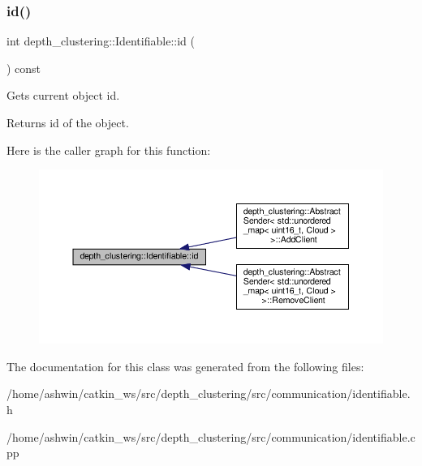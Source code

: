 \subsubsection{\texorpdfstring{id()}{id()}}
{\footnotesize\ttfamily int depth\+\_\+clustering\+::\+Identifiable\+::id (\begin{DoxyParamCaption}{ }\end{DoxyParamCaption}) const\hspace{0.3cm}{\ttfamily [inline]}}



Gets current object id. 

\begin{DoxyReturn}{Returns}
id of the object. 
\end{DoxyReturn}
Here is the caller graph for this function\+:\nopagebreak
\begin{figure}[H]
\begin{center}
\leavevmode
\includegraphics[width=350pt]{classdepth__clustering_1_1Identifiable_a50f8b49ce7f7f0d9d02f31f74e0fc9e0_icgraph}
\end{center}
\end{figure}


The documentation for this class was generated from the following files\+:\begin{DoxyCompactItemize}
\item 
/home/ashwin/catkin\+\_\+ws/src/depth\+\_\+clustering/src/communication/identifiable.\+h\item 
/home/ashwin/catkin\+\_\+ws/src/depth\+\_\+clustering/src/communication/identifiable.\+cpp\end{DoxyCompactItemize}
